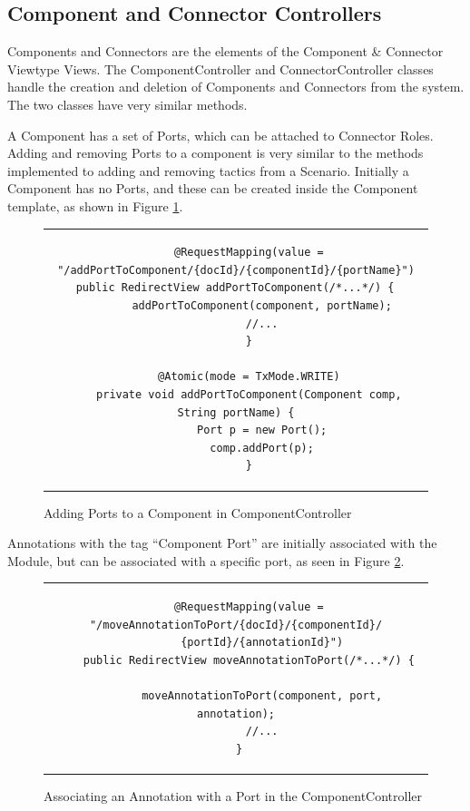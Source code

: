 \subsection{Component and Connector Controllers}

Components and Connectors are the elements of the Component \& Connector Viewtype Views. The ComponentController and ConnectorController classes handle the creation and deletion of Components and Connectors from the system. The two classes have very similar methods.

A Component has a set of Ports, which can be attached to Connector Roles. Adding and removing Ports to a component is very similar to the methods implemented to adding and removing tactics from a Scenario. Initially a Component has no Ports, and these can be created inside the Component template, as shown in Figure \ref{figure:ComponentControllerAddingPorts}. 
\begin{figure}[h]
\centering
\lstset{style=customjava}
\begin{tabular}{c}
\begin{lstlisting}
	@RequestMapping(value = "/addPortToComponent/{docId}/{componentId}/{portName}")
	public RedirectView addPortToComponent(/*...*/) {		
		addPortToComponent(component, portName);
		//...
	}

	@Atomic(mode = TxMode.WRITE)
	private void addPortToComponent(Component comp, String portName) {
		Port p = new Port();
		comp.addPort(p);
	}
\end{lstlisting}
\end{tabular}
\caption{Adding Ports to a Component in ComponentController}
\label{figure:ComponentControllerAddingPorts}
\end{figure}

Annotations with the tag ``Component Port'' are initially associated with the Module, but can be associated with a specific port, as seen in Figure \ref{figure:ComponentControllerLinkToPort}. 

\begin{figure}[h]
\centering
\lstset{style=customjava}
\begin{tabular}{c}
\begin{lstlisting}
	@RequestMapping(value = "/moveAnnotationToPort/{docId}/{componentId}/
		{portId}/{annotationId}")
	public RedirectView moveAnnotationToPort(/*...*/) {
		
		moveAnnotationToPort(component, port, annotation);
		//...
	}	
\end{lstlisting}
\end{tabular}
\caption{Associating an Annotation with a Port in the ComponentController}
\label{figure:ComponentControllerLinkToPort}
\end{figure}

